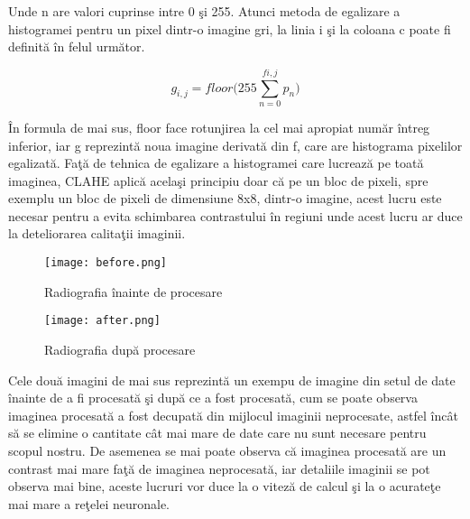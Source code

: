 Unde n are valori cuprinse intre 0 \c{s}i 255. Atunci metoda de egalizare a histogramei pentru un pixel dintr-o imagine gri, la linia i \c{s}i la coloana c poate fi definit\u{a} \^{i}n felul urm\u{a}tor.

$$g_{i,j} = floor\bigg( 255 \sum_{n=0}^{f{i,j}} p_n \bigg)$$

\^{I}n formula de mai sus, floor face rotunjirea la cel mai apropiat num\u{a}r \^{i}ntreg inferior, iar g reprezint\u{a} noua imagine derivat\u{a} din f, care are histograma pixelilor egalizat\u{a}. Fa\c{t}\u{a} de tehnica de egalizare a histogramei care lucreaz\u{a} pe toat\u{a} imaginea, CLAHE aplic\u{a} acela\c{s}i principiu doar c\u{a} pe un bloc de pixeli, spre exemplu un bloc de pixeli de dimensiune 8x8, dintr-o imagine, acest lucru este necesar pentru a evita schimbarea contrastului \^{i}n regiuni unde acest lucru ar duce la deteliorarea calita\c{t}ii imaginii.

\begin{figure}[h!]
  \center
  \texttt{[image: before.png]}
  \caption{Radiografia \^{i}nainte de procesare}
\end{figure}

\begin{figure}[h!]
  \center
  \texttt{[image: after.png]}
  \caption{Radiografia dup\u{a} procesare}
\end{figure}

Cele dou\u{a} imagini de mai sus reprezint\u{a} un exempu de imagine din setul de date \^{i}nainte de a fi procesat\u{a} \c{s}i dup\u{a} ce a fost procesat\u{a}, cum se poate observa imaginea procesat\u{a} a fost decupat\u{a} din mijlocul imaginii neprocesate, astfel \^{i}nc\^{a}t s\u{a} se elimine o cantitate c\^{a}t mai mare de date care nu sunt necesare pentru scopul nostru. De asemenea se mai poate observa c\u{a} imaginea procesat\u{a} are un contrast mai mare fa\c{t}\u{a} de imaginea neprocesat\u{a}, iar detaliile imaginii se pot observa mai bine, aceste lucruri vor duce la o vitez\u{a} de calcul \c{s}i la o acurate\c{t}e mai mare a re\c{t}elei neuronale.

\par

